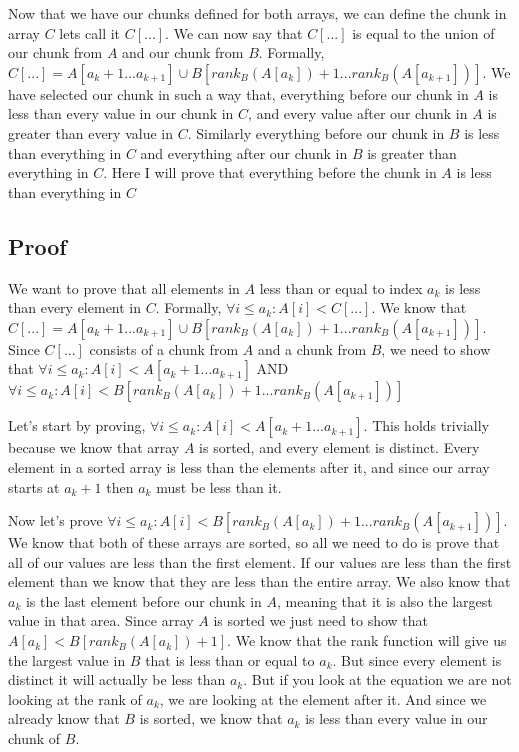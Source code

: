 \documentclass[11pt]{article}
\begin{document}
Now that we have our chunks defined for both arrays, we can define the chunk in array $C$ lets call it $C[...]$. We can now say that $C[...]$ is equal to the union of our chunk from $A$ and our chunk from $B$. Formally,
$C[...] = A[a_k+1 ... a_{k+1}] \cup B[rank_B(A[a_k])+1 ... rank_B(A[a_{k+1}])]$. We have selected our chunk in such a way that, everything before our chunk in $A$ is less than every value in our chunk in $C$, and every value after our chunk in $A$ is greater than every value in $C$. Similarly everything before our chunk in $B$ is less than everything in $C$ and everything after our chunk in $B$ is greater than everything in $C$. Here I will prove that everything before the chunk in $A$ is less than everything in $C$

\subsection{Proof}
We want to prove that all elements in $A$ less than or equal to index $a_k$ is less than every element in $C$. Formally,  $\forall i \leq a_k : A[i] < C[...]$. We know that $C[...] = A[a_k+1 ... a_{k+1}] \cup B[rank_B(A[a_k])+1 ... rank_B(A[a_{k+1}])]$. Since $C[...]$ consists of a chunk from $A$ and a chunk from $B$, we need to show that $\forall i \leq a_k : A[i] < A[a_k+1 ... a_{k+1}]$ AND $\forall i \leq a_k : A[i] < B[rank_B(A[a_k])+1 ... rank_B(A[a_{k+1}])]$

Let's start by proving, $\forall i \leq a_k : A[i] < A[a_k+1 ... a_{k+1}]$. This holds trivially because we know that array $A$ is sorted, and every element is distinct. Every element in a sorted array is less than the elements after it, and since our array starts at $a_k+1$ then $a_k$ must be less than it.

Now let's prove $\forall i \leq a_k : A[i] < B[rank_B(A[a_k])+1 ... rank_B(A[a_{k+1}])]$. We know that both of these arrays are sorted, so all we need to do is prove that all of our values are less than the first element. If our values are less than the first element than we know that they are less than the entire array. We also know that $a_k$ is the last element before our chunk in $A$, meaning that it is also the largest value in that area. Since array $A$ is sorted we just need to show that $A[a_k] < B[rank_B(A[a_k])+1]$. We know that the rank function will give us the largest value in $B$ that is less than or equal to $a_k$. But since every element is distinct it will actually be less than $a_k$. But if you look at the equation we are not looking at the rank of $a_k$, we are looking at the element after it. And since we already know that $B$ is sorted, we know that $a_k$ is less than every value in our chunk of $B$.
\end{document}
